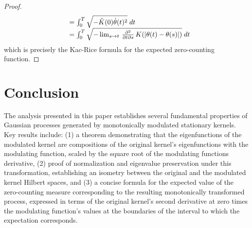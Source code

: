 \documentclass{mc}
\begin{document}
\begin{proof}
\begin{equation}
\begin{array}{ll}
      & = \int_0^T \sqrt{- \ddot{K} (0) \dot{\theta} (t)^2}  \hspace{0.27em}
      dt\\
      & = \int_0^T \sqrt{- \lim_{s \to t}  \hspace{0.17em}
      \frac{\partial^2}{\partial t \partial s}  \hspace{0.17em} K (| \theta
      (t) - \theta (s) |)}  \hspace{0.27em} dt
    \end{array}
  \end{equation}
  which is precisely the Kac-Rice formula for the expected zero-counting
  function.
\end{proof}

\section{Conclusion}

The analysis presented in this paper establishes several fundamental
properties of Gaussian processes generated by monotonically modulated
stationary kernels. Key results include: (1) a theorem demonstrating that the
eigenfunctions of the modulated kernel are compositions of the original
kernel's eigenfunctions with the modulating function, scaled by the square
root of the modulating functions derivative, (2) proof of normalization and
eigenvalue preservation under this transformation, establishing an isometry
between the original and the modulated kernel Hilbert spaces, and (3) a concise
formula for the expected value of the zero-counting measure corresponding to
the resulting monotonically transformed process, expressed in terms of the
original kernel's second derivative at zero times the modulating function's
values at the boundaries of the interval to which the expectation corresponds.



\end{document}
